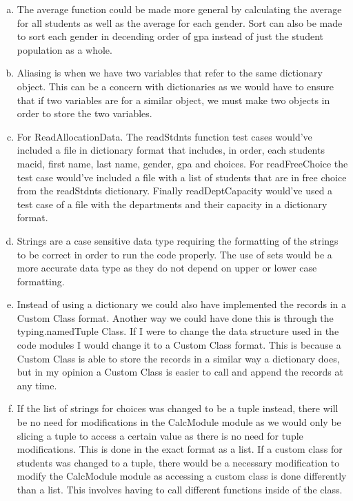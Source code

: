 \documentclass[12pt]{article}
\begin{document}
\begin{enumerate}[(a)]

\item The average function could be made more general by calculating the average for all students as well as the average for each gender. Sort can also be made to sort each gender in decending order of gpa instead of just the student population as a whole.

\item Aliasing is when we have two variables that refer to the same dictionary object. This can be a concern with dictionaries as we would have to ensure that if two variables are for a similar object, we must make two objects in order to store the two variables.

\item  For ReadAllocationData. The readStdnts function test cases would've included a file in dictionary format that includes, in order, each students macid, first name, last name, gender, gpa and choices. For readFreeChoice the test case would've included a file with a list of students that are in free choice from the readStdnts dictionary. Finally readDeptCapacity would've used a test case of a file with the departments and their capacity in a dictionary format.

\item Strings are a case sensitive data type requiring the formatting of the strings to be correct in order to run the code properly. The use of sets would be a more accurate data type as they do not depend on upper or lower case formatting.

\item Instead of using a dictionary we could also have implemented the records in a Custom Class format. Another way we could have done this is through the typing.namedTuple Class. If I were to change the data structure used in the code modules I would change it to a Custom Class format. This is because a Custom Class is able to store the records in a similar way a dictionary does, but in my opinion a Custom Class is easier to call and append the records at any time.

\item If the list of strings for choices was changed to be a tuple instead, there will be no need for modifications in the CalcModule module as we would only be slicing a tuple to access a certain value as there is no need for tuple modifications. This is done in the exact format as a list. If a custom class for students was changed to a tuple, there would be a necessary modification to modify the CalcModule module as accessing a custom class is done differently than a list. This involves having to call different functions inside of the class.

\end{enumerate}
\end{document}

